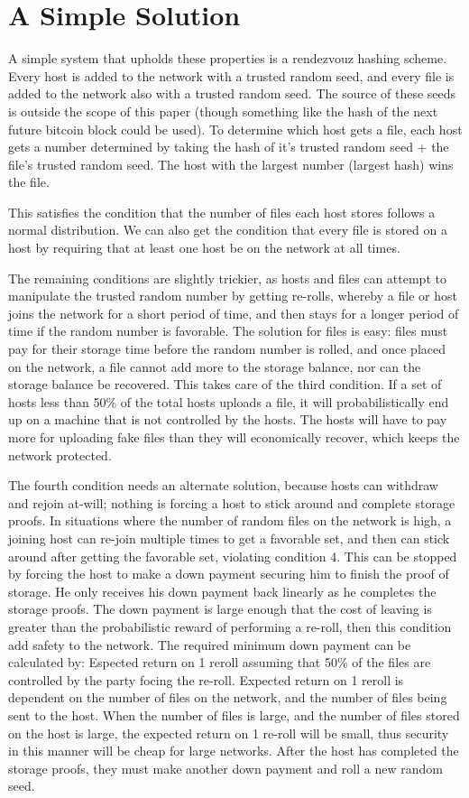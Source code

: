 \documentclass[twocolumn]{article}
\begin{document}
\section{A Simple Solution}
A simple system that upholds these properties is a rendezvouz hashing scheme.
Every host is added to the network with a trusted random seed, and every file is added to the network also with a trusted random seed.
The source of these seeds is outside the scope of this paper (though something like the hash of the next future bitcoin block could be used).
To determine which host gets a file, each host gets a number determined by taking the hash of it's trusted random seed + the file's trusted random seed.
The host with the largest number (largest hash) wins the file.

This satisfies the condition that the number of files each host stores follows a normal distribution.
We can also get the condition that every file is stored on a host by requiring that at least one host be on the network at all times.

The remaining conditions are slightly trickier, as hosts and files can attempt to manipulate the trusted random number by getting re-rolls, whereby a file or host joins the network for a short period of time, and then stays for a longer period of time if the random number is favorable.
The solution for files is easy: files must pay for their storage time before the random number is rolled, and once placed on the network, a file cannot add more to the storage balance, nor can the storage balance be recovered.
This takes care of the third condition.
If a set of hosts less than 50\% of the total hosts uploads a file, it will probabilistically end up on a machine that is not controlled by the hosts.
The hosts will have to pay more for uploading fake files than they will economically recover, which keeps the network protected.

The fourth condition needs an alternate solution, because hosts can withdraw and rejoin at-will; nothing is forcing a host to stick around and complete storage proofs.
In situations where the number of random files on the network is high, a joining host can re-join multiple times to get a favorable set, and then can stick around after getting the favorable set, violating condition 4.
This can be stopped by forcing the host to make a down payment securing him to finish the proof of storage.
He only receives his down payment back linearly as he completes the storage proofs.
The down payment is large enough that the cost of leaving is greater than the probabilistic reward of performing a re-roll, then this condition add safety to the network.
The required minimum down payment can be calculated by:
Espected return on 1 reroll assuming that 50\% of the files are controlled by the party focing the re-roll.
Expected return on 1 reroll is dependent on the number of files on the network, and the number of files being sent to the host.
When the number of files is large, and the number of files stored on the host is large, the expected return on 1 re-roll will be small, thus security in this manner will be cheap for large networks.
After the host has completed the storage proofs, they must make another down payment and roll a new random seed.
\end{document}
